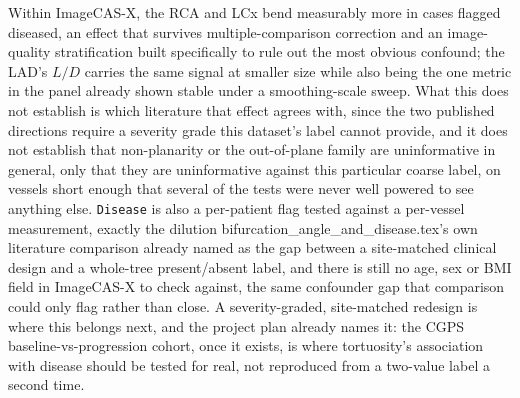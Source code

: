 Within ImageCAS-X, the RCA and LCx bend measurably more in cases flagged diseased, an effect that
survives multiple-comparison correction and an image-quality stratification built specifically to
rule out the most obvious confound; the LAD's $L/D$ carries the same signal at smaller size while
also being the one metric in the panel already shown stable under a smoothing-scale sweep. What
this does not establish is which literature that effect agrees with, since the two published
directions require a severity grade this dataset's label cannot provide, and it does not establish
that non-planarity or the out-of-plane family are uninformative in general, only that they are
uninformative against this particular coarse label, on vessels short enough that several of the
tests were never well powered to see anything else. \texttt{Disease} is also a per-patient flag
tested against a per-vessel measurement, exactly the dilution
bifurcation\_angle\_and\_disease.tex's own literature comparison already named as the gap between a
site-matched clinical design and a whole-tree present/absent label, and there is still no age, sex
or BMI field in ImageCAS-X to check against, the same confounder gap that comparison could only flag rather than close.
A severity-graded, site-matched redesign is where this belongs next, and the project plan already
names it: the CGPS baseline-vs-progression cohort, once it exists, is where tortuosity's
association with disease should be tested for real, not reproduced from a two-value label a second
time.
